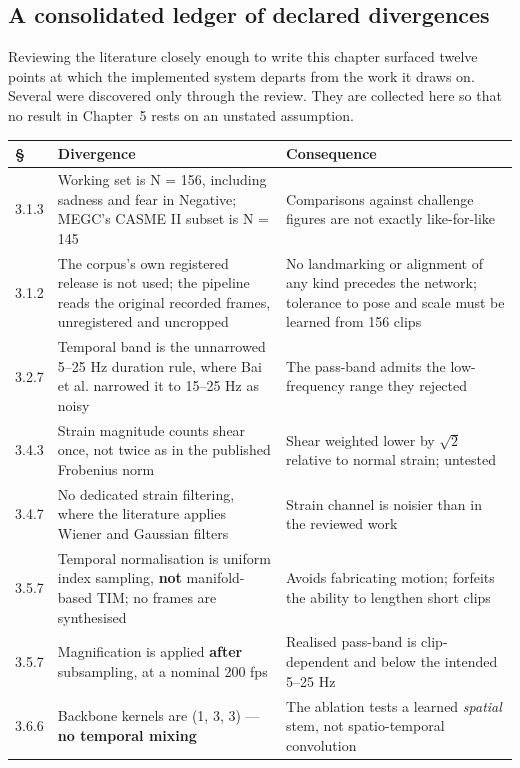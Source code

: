 \subsection{A consolidated ledger of declared divergences}
\label{sec:divergence-ledger}

Reviewing the literature closely enough to write this chapter surfaced twelve points at which the implemented system departs from the work it draws on. Several were discovered only through the review. They are collected here so that no result in Chapter~5 rests on an unstated assumption.

\begin{table}[htbp]
	\centering
	\footnotesize
	\begin{tabular}{p{0.9cm} p{5.8cm} p{5.8cm}}
		\hline
		\textbf{\S} & \textbf{Divergence} & \textbf{Consequence} \\
		\hline
		3.1.3 & Working set is N = 156, including sadness and fear in Negative; MEGC's CASME II subset is N = 145 & Comparisons against challenge figures are not exactly like-for-like \\
		3.1.2 & The corpus's own registered release is not used; the pipeline reads the original recorded frames, unregistered and uncropped & No landmarking or alignment of any kind precedes the network; tolerance to pose and scale must be learned from 156 clips \\
		3.2.7 & Temporal band is the unnarrowed 5--25 Hz duration rule, where Bai et al. narrowed it to 15--25 Hz as noisy & The pass-band admits the low-frequency range they rejected \\
		3.4.3 & Strain magnitude counts shear once, not twice as in the published Frobenius norm & Shear weighted lower by $\sqrt{2}$ relative to normal strain; untested \\
		3.4.7 & No dedicated strain filtering, where the literature applies Wiener and Gaussian filters & Strain channel is noisier than in the reviewed work \\
		3.5.7 & Temporal normalisation is uniform index sampling, \textbf{not} manifold-based TIM; no frames are synthesised & Avoids fabricating motion; forfeits the ability to lengthen short clips \\
		3.5.7 & Magnification is applied \textbf{after} subsampling, at a nominal 200 fps & Realised pass-band is clip-dependent and below the intended 5--25 Hz \\
		3.6.6 & Backbone kernels are (1, 3, 3) --- \textbf{no temporal mixing} & The ablation tests a learned \textit{spatial} stem, not spatio-temporal convolution \\

\end{tabular}
\end{table}
